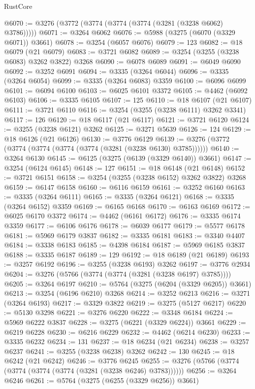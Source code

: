 \begin{lexlean}{RustCore}
\begin{coremodule}
@6070 := @3276 (@3772 (@3774 (@3774 (@3774 (@3281 (@3238 @6062) @3786)))))
@6071 := @3264 @6062
@6076 := @5988 (@3275 (@6070 (@3329 @6071)) @3661)
@6078 := @3254 (@6057 @6076)
@6079 := 123
@6082 := @18 @6079 (@21 @6079)
@6083 := @3721 @6082
@6089 := @3254 (@3255 (@3238 @6083) @3262 @3822) @3268
@6090 := @6078 @6089
@6091 := @6049 @6090
@6092 := @3252 @6091
@6094 := @3335 (@3264 @6044)
@6096 := @3335 (@3264 @6054)
@6099 := @3335 (@3264 @6083) @3359
@6100 := @6096 @6099
@6101 := @6094 @6100
@6103 := @6025 @6101 @3372
@6105 := @4462 (@6092 @6103)
@6106 := @3335 @6105
@6107 := 125
@6110 := @18 @6107 (@21 @6107)
@6111 := @3721 @6110
@6116 := @3254 (@3255 (@3238 @6111) @3262 @3341)
@6117 := 126
@6120 := @18 @6117 (@21 @6117)
@6121 := @3721 @6120
@6124 := @3255 (@3238 @6121) @3262
@6125 := @3271 @5639
@6126 := 124
@6129 := @18 @6126 (@21 @6126)
@6130 := @3776 @6129
@6139 := @3276 (@3772 (@3774 (@3774 (@3774 (@3774 (@3281 (@3238 @6130) @3785))))))
@6140 := @3264 @6130
@6145 := @6125 (@3275 (@6139 (@3329 @6140)) @3661)
@6147 := @3254 (@6124 @6145)
@6148 := 127
@6151 := @18 @6148 (@21 @6148)
@6152 := @3721 @6151
@6158 := @3254 (@3255 (@3238 @6152) @3262 @3822) @3268
@6159 := @6147 @6158
@6160 := @6116 @6159
@6161 := @3252 @6160
@6163 := @3335 (@3264 @6111)
@6165 := @3335 (@3264 @6121)
@6168 := @3335 (@3264 @6152) @3359
@6169 := @6165 @6168
@6170 := @6163 @6169
@6172 := @6025 @6170 @3372
@6174 := @4462 (@6161 @6172)
@6176 := @3335 @6174 @3359
@6177 := @6106 @6176
@6178 := @6039 @6177
@6179 := @5577 @6178
@6181 := @5969 @6179 @3837
@6182 := @3335 @6181
@6183 := @3340 @4407
@6184 := @3338 @6183
@6185 := @4398 @6184
@6187 := @5969 @6185 @3837
@6188 := @3335 @6187
@6189 := 129
@6192 := @18 @6189 (@21 @6189)
@6193 := @3257 @6192
@6196 := @3255 (@3238 @6193) @3262
@6197 := @3776 @2934
@6204 := @3276 (@5766 (@3774 (@3774 (@3281 (@3238 @6197) @3785))))
@6205 := @3264 @6197
@6210 := @5764 (@3275 (@6204 (@3329 @6205)) @3661)
@6213 := @3254 (@6196 @6210) @3268
@6214 := @3252 @6213
@6216 := @3271 (@3264 @6193)
@6217 := @3329 @3822
@6219 := @3275 (@5127 @6217)
@6220 := @5130 @3298
@6221 := @3276 @6220
@6222 := @3348 @6184
@6224 := @5969 @6222 @3837
@6228 := @3275 (@6221 (@3329 @6224)) @3661
@6229 := @6219 @6228
@6230 := @6216 @6229
@6232 := @4462 (@6214 @6230)
@6233 := @3335 @6232
@6234 := 131
@6237 := @18 @6234 (@21 @6234)
@6238 := @3257 @6237
@6241 := @3255 (@3238 @6238) @3262
@6242 := 130
@6245 := @18 @6242 (@21 @6242)
@6246 := @3776 @6245
@6255 := @3276 (@5766 (@3774 (@3774 (@3774 (@3774 (@3281 (@3238 @6246) @3783))))))
@6256 := @3264 @6246
@6261 := @5764 (@3275 (@6255 (@3329 @6256)) @3661)

\end{coremodule}
\end{lexlean}
